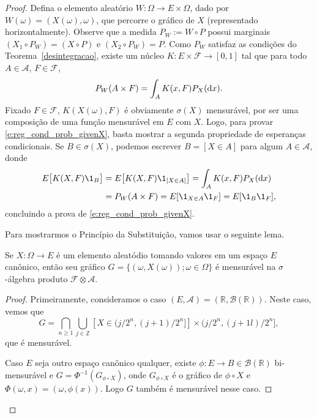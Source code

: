 \documentclass[../Notas_de_aula.tex]{subfiles}
\begin{document}
\begin{proof}
  Defina o elemento aleatório $W: \Omega \to E \times \Omega$, dado por $W(\omega) = (X(\omega), \omega)$, que percorre o gráfico de $X$ (representado horizontalmente).
  Observe que a medida $P_W := W \circ P$ possui marginais $(X_1 \circ P_W) = (X \circ P)$ e $(X_2 \circ P_W) = P$.
  Como $P_W$ satisfaz as condições do Teorema~\ref{desintegracao}, existe um núcleo $K: E \times \mathcal{F} \to [0,1]$ tal que para todo $A \in \mathcal{A}$, $F \in \mathcal{F}$,
  \begin{equation}
    P_W(A \times F) = \int_A K(x, F) P_X (\mathop{}\!\mathrm{d} x).
  \end{equation}
  Fixado $F \in \mathcal{F}$, $K(X(\omega), F)$ é obviamente $\sigma(X)$ mensurável, por ser uma composição de uma função mensurável em $E$ com $X$.
  Logo, para provar \eqref{e:reg_cond_prob_givenX}, basta mostrar a segunda propriedade de esperanças condicionais.
  Se $B \in \sigma(X)$, podemos escrever $B = [X \in A]$ para algum $A \in \mathcal{A}$, donde
  \begin{equation}
    \begin{split}
      E\big[ K(X, F) \1_B \big] & = E\big[ K(X, F) \1_{[X \in A]} \big] = \int_A K(x, F) P_X(\d x)\\
      & = P_W (A \times F) = E[\1_{X \in A} \1_F] = E[\1_B \1_F],
    \end{split}
  \end{equation}
  concluindo a prova de \eqref{e:reg_cond_prob_givenX}.

  Para mostrarmos o Princípio da Substituição, vamos usar o seguinte lema.

  \begin{lemma}
    Se $X : \Omega \to E$ é um elemento aleatódio tomando valores em um espaço $E$ canônico, então seu gráfico $G = \{(\omega, X(\omega)); \omega \in \Omega\}$ é mensurável na $\sigma$-álgebra produto $\mathcal{F} \otimes \mathcal{A}$.
  \end{lemma}

  \begin{proof}
    Primeiramente, consideramos o caso $(E, \mathcal{A}) = (\mathbb{R}, \mathcal{B}(\mathbb{R}))$.
    Neste caso, vemos que
    \begin{equation}
      G = \bigcap_{n \geq 1} \bigcup_{j \in \mathbb{Z}} [X \in \big(j/2^n, (j+1)/2^n \big]] \times \big( j/2^n, (j+1l)/2^n \big],
    \end{equation}
    que é mensurável.

    Caso $E$ seja outro espaço canônico qualquer, existe $\phi: E \to B \in \mathcal{B}(\mathbb{R})$ bi-mensurável e $G = \Phi^{-1}(G_{\phi \circ X})$, onde $G_{\phi \circ X}$ é o gráfico de $\phi \circ X$ e $\Phi(\omega, x) = (\omega, \phi(x))$.
    Logo $G$ também é mensurável nesse caso.
  \end{proof}


\end{proof}
\end{document}

